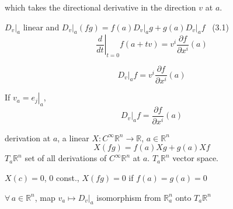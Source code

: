 which takes the directional derivative in the direction $v$ at $a$.  

$\left. D_v \right|_a$ linear and $\left. D_v \right|_a(fg) = f(a) \left. D_v \right|_a g + g(a) \left. D_v\right|_a f$ \quad \, (3.1)
\[
\left. \frac{d}{dt} \right|_{t=0} f(a+tv) = v^i \frac{\partial f}{ \partial x^i}(a)
\]

\[
 \left. D_v \right|_a f = v^i \frac{ \partial f}{ \partial x^i}(a)
\]

If $v_a = \left. e_j \right|_a$, 
\[
\left. D_v \right|_a f = \frac{ \partial f}{ \partial x^i}(a)
\]

derivation at $a$, a linear $X: C^{\infty}\mathbb{R}^n \to \mathbb{R}$, $a\in \mathbb{R}^n$
\[
X(fg) = f(a) Xg + g(a) Xf
\]
$T_a\mathbb{R}^n$ set of all derivations of $C^{\infty}\mathbb{R}^n$ at $a$.  $T_a\mathbb{R}^n$ vector space.  

\begin{lemma}[3.1] $X(c) =0$, $0$ const., $X(fg) = 0$ if $f(a) = g(a) =0$ \end{lemma}


\begin{proposition}[3.2] $\forall\, a \in \mathbb{R}^n$, map $v_a \mapsto \left. D_v \right|_a$ isomorphism from $\mathbb{R}^n_a $ onto $T_a\mathbb{R}^n$ \end{proposition}

